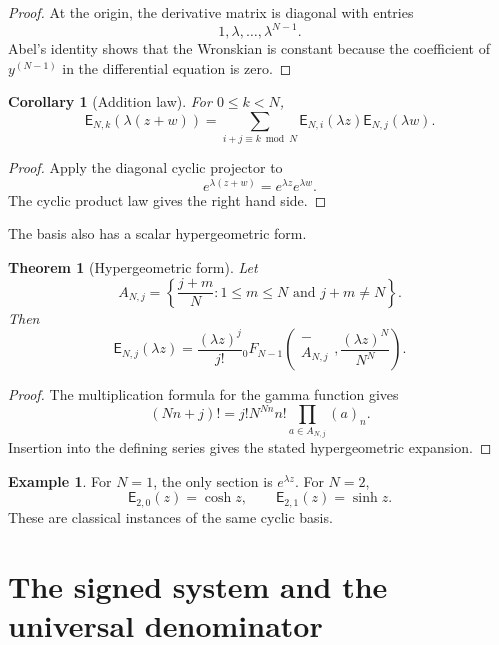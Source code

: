 \documentclass{aomart}
\newtheorem{theorem}{Theorem}[section]
\newtheorem{corollary}[corollary]{Corollary}
\theoremstyle{definition}
\newtheorem{example}[example]{Example}
\theoremstyle{remark}
\newcommand{\Efun}{\mathsf E}
\begin{document}
\begin{proof}
At the origin, the derivative matrix is diagonal with entries
\[
1,\lambda,\ldots,\lambda^{N-1}.
\]
Abel's identity shows that the Wronskian is constant because the coefficient of $y^{(N-1)}$ in the differential equation is zero.
\end{proof}

\begin{corollary}[Addition law]\label{cor:exponential_addition}
For $0\leq k<N$,
\[
\Efun_{N,k}(\lambda(z+w))
=
\sum_{i+j\equiv k\bmod N}
\Efun_{N,i}(\lambda z)\Efun_{N,j}(\lambda w).
\]
\end{corollary}

\begin{proof}
Apply the diagonal cyclic projector to
\[
e^{\lambda(z+w)}=e^{\lambda z}e^{\lambda w}.
\]
The cyclic product law gives the right hand side.
\end{proof}

The basis also has a scalar hypergeometric form.

\begin{theorem}[Hypergeometric form]\label{thm:hypergeometric_form}
Let
\[
A_{N,j}
=
\left\{
\frac{j+m}{N}
\mathrel{:}
1\leq m\leq N
\text{ and }
j+m\ne N
\right\}.
\]
Then
\[
\Efun_{N,j}(\lambda z)
=
\frac{(\lambda z)^j}{j!}
{}_0F_{N-1}
\left(
\begin{matrix}-\\ A_{N,j}\end{matrix}
\mathrel{,}
\frac{(\lambda z)^N}{N^N}
\right).
\]
\end{theorem}

\begin{proof}
The multiplication formula for the gamma function gives
\[
(Nn+j)!
=
j!N^{Nn}n!
\prod_{a\in A_{N,j}}(a)_n.
\]
Insertion into the defining series gives the stated hypergeometric expansion.
\end{proof}

\begin{example}\label{ex:classical_exponential}
For $N=1$, the only section is $e^{\lambda z}$.  For $N=2$,
\[
\Efun_{2,0}(z)=\cosh z,
\qquad
\Efun_{2,1}(z)=\sinh z.
\]
These are classical instances of the same cyclic basis.
\end{example}

\section{The signed system and the universal denominator}\label{sec:signed_system}
\end{document}
